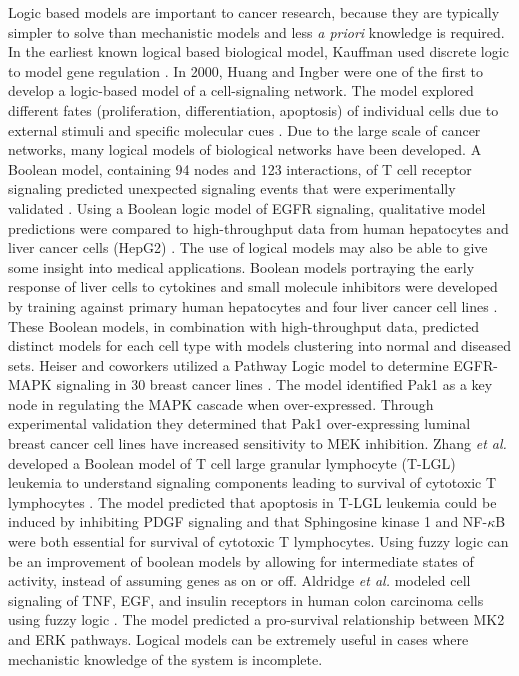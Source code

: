 \documentclass[12pt]{article}
\begin{document}
Logic based models are important to cancer research, because they are typically simpler to solve than mechanistic models and less \textit{a priori} knowledge is required. 
In the earliest known logical based biological model, Kauffman used discrete logic to model gene regulation \cite{Kauffman1969}. 
In 2000, Huang and Ingber were one of the first to develop a logic-based model of a cell-signaling network. 
The model explored different fates (proliferation, differentiation, apoptosis) of individual cells due to external stimuli and specific molecular cues \cite{Huang2000}. 
Due to the large scale of cancer networks, many logical models of biological networks have been developed. 
A Boolean model, containing 94 nodes and 123 interactions, of T cell receptor signaling predicted unexpected signaling events that were experimentally validated \cite{Saez-Rodriguez2007}. 
Using a Boolean logic model of EGFR signaling, qualitative model predictions were compared to high-throughput data from human hepatocytes and liver cancer cells (HepG2) \cite{Samaga2009}. 
The use of logical models may also be able to give some insight into medical applications. Boolean models portraying the early response of liver cells to cytokines and small molecule inhibitors were developed by training against primary human hepatocytes and four liver cancer cell lines \cite{Saez-Rodriguez2009,Saez-Rodriguez2011}. 
These Boolean models, in combination with high-throughput data, predicted distinct models for each cell type with models clustering into normal and diseased sets. 
Heiser and coworkers utilized a Pathway Logic model to determine EGFR-MAPK signaling in 30 breast cancer lines \cite{Heiser2009}. 
The model identified Pak1 as a key node in regulating the MAPK cascade when over-expressed. 
Through experimental validation they determined that Pak1 over-expressing luminal breast cancer cell lines have increased sensitivity to MEK inhibition.  
Zhang \textit{et al.} developed a Boolean model of T cell large granular lymphocyte (T-LGL) leukemia to understand signaling components leading to survival of cytotoxic T lymphocytes \cite{Zhang2008}. 
The model predicted that apoptosis in T-LGL leukemia could be induced by inhibiting PDGF signaling and that Sphingosine kinase 1 and NF-$\kappa$B were both essential for survival of cytotoxic T lymphocytes.
Using fuzzy logic can be an improvement of boolean models by allowing for intermediate states of activity, instead of assuming genes as on or off. 
Aldridge \textit{et al.} modeled cell signaling of TNF, EGF, and insulin receptors in human colon carcinoma cells using fuzzy logic \cite{Aldridge2009}. 
The model predicted a pro-survival relationship between MK2 and ERK pathways. 
Logical models can be extremely useful in cases where mechanistic knowledge of the system is incomplete.
\end{document}
